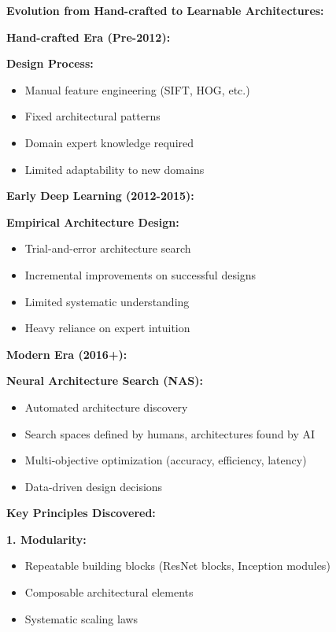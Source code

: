 \documentclass[12pt]{article}
\begin{document}
\begin{enumerate}[(a)]
{    \textbf{Evolution from Hand-crafted to Learnable Architectures:}
    
    \textbf{Hand-crafted Era (Pre-2012):}
    
    \textbf{Design Process:}
    \begin{itemize}
        \item Manual feature engineering (SIFT, HOG, etc.)
        \item Fixed architectural patterns
        \item Domain expert knowledge required
        \item Limited adaptability to new domains
    \end{itemize}
    
    \textbf{Early Deep Learning (2012-2015):}
    
    \textbf{Empirical Architecture Design:}
    \begin{itemize}
        \item Trial-and-error architecture search
        \item Incremental improvements on successful designs
        \item Limited systematic understanding
        \item Heavy reliance on expert intuition
    \end{itemize}
    
    \textbf{Modern Era (2016+):}
    
    \textbf{Neural Architecture Search (NAS):}
    \begin{itemize}
        \item Automated architecture discovery
        \item Search spaces defined by humans, architectures found by AI
        \item Multi-objective optimization (accuracy, efficiency, latency)
        \item Data-driven design decisions
    \end{itemize}
    
    \textbf{Key Principles Discovered:}
    
    \textbf{1. Modularity:}
    \begin{itemize}
        \item Repeatable building blocks (ResNet blocks, Inception modules)
        \item Composable architectural elements
        \item Systematic scaling laws
    \end{itemize}
    
}
\end{enumerate}
\end{document}
